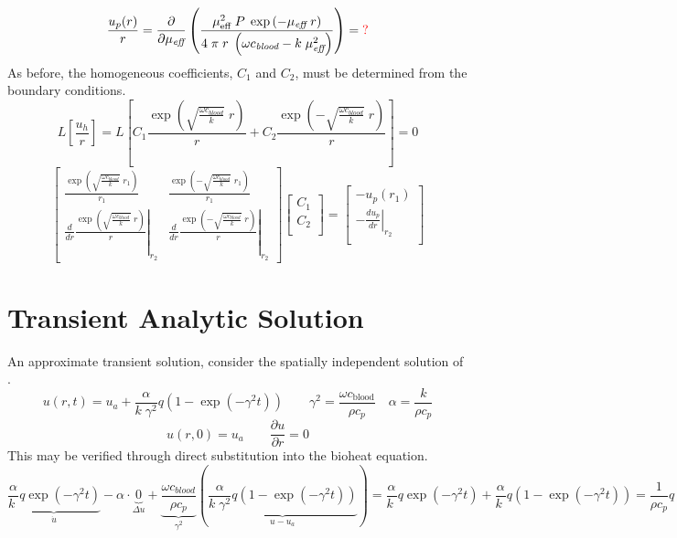 \documentclass{article}         %
\theoremstyle{definition}
\theoremstyle{remark}
\begin{document}
\[
  \frac{u_p(r)}{r} = 
    \frac{\partial }{\partial \mu_\textit{eff}}
   \left(
    \frac{\mu_\text{eff}^2 \; P \; \exp \left(-\mu_\textit{eff} \; r \right) }
         { 4 \; \pi \; r \; \left(\omega c_\textit{blood}-k \; \mu_\textit{eff}^2 \right)} 
   \right)
   = \text{\color{red}?}
\]
As before, the homogeneous coefficients, $C_1$ and $C_2$, must be determined from the 
boundary conditions.
\[
  L \left[\frac{u_h}{r} \right] =   
 L\left[
    C_1 \frac{\exp\left( \sqrt{\frac{\omega c_\textit{blood}}{k}} \; r \right)}{r}  
  + 
    C_2 \frac{\exp\left(-\sqrt{\frac{\omega c_\textit{blood}}{k}} \; r \right)}{r}  
\right]
  = 0
\]
\[
\begin{bmatrix}
    \frac{\exp\left( \sqrt{\frac{\omega c_\textit{blood}}{k}} \; r_1 \right)}{r_1}  
  & 
    \frac{\exp\left(-\sqrt{\frac{\omega c_\textit{blood}}{k}} \; r_1 \right)}{r_1}  
  \\
  \left.
   \frac{d}{dr}
    \frac{\exp\left( \sqrt{\frac{\omega c_\textit{blood}}{k}} \; r \right)}{r}  
  \right|_{r_2}
  & 
  \left.
   \frac{d}{dr}
    \frac{\exp\left(-\sqrt{\frac{\omega c_\textit{blood}}{k}} \; r \right)}{r}  
  \right|_{r_2}
\end{bmatrix}
\begin{bmatrix}
  C_1 \\
  C_2 \\
\end{bmatrix}
= 
\begin{bmatrix}
       - u_p(r_1)     \\
  - \left. \frac{d u_p}{dr} 
  \right|_{r_2}\\
\end{bmatrix}
\]
\section{Transient Analytic Solution}

An approximate transient solution, consider the spatially independent
solution of \cite{Giordano2010}.
\[
 u(r,t) = u_a + \frac{\alpha}{k\; \gamma^2} q \left( 1 - \exp(-\gamma^2 t)\right)
 \qquad
  \gamma^2 = \frac{\omega c_\text{blood}}{\rho c_p}
 \quad
  \alpha  = \frac{k}{\rho c_p}
\]
\[
 u(r,0) = u_a 
 \qquad
 \frac{\partial u}{\partial r} = 0 
\]
This may be verified through direct substitution into the bioheat equation.
\[
 \underbrace{\frac{\alpha}{k\; } q  \exp(-\gamma^2 t)}_{\dot{u} }
 -  \alpha  \cdot
\underbrace{ 0}_{\Delta u }
 + 
\underbrace{ 
  \frac{\omega c_\textit{blood}}{\rho c_p} 
  }_{\gamma^2 }
  \left(
 \underbrace{
  \frac{\alpha}{k\; \gamma^2} q \left( 1 - \exp(-\gamma^2 t)\right)
   }_{u  - u_a }
   \right)
  = 
 \frac{\alpha}{k\; } q  \exp(-\gamma^2 t)
  +
 \frac{\alpha}{k\; } q 
      \left( 1 - \exp(-\gamma^2 t)\right)
  = 
 \frac{1}{\rho c_p } q 
\]
\end{document}
